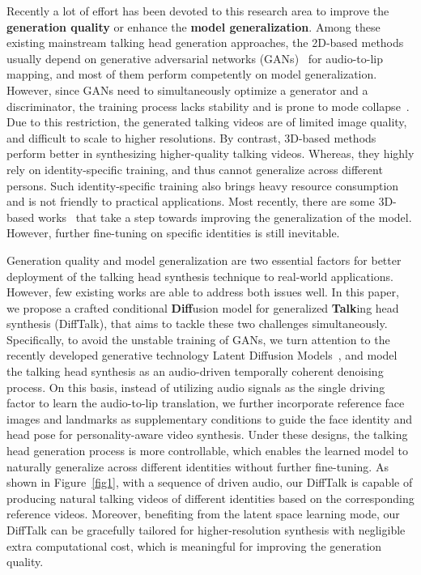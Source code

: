 \documentclass[10pt,twocolumn,letterpaper]{article}
\begin{document}
Recently a lot of effort has been devoted to this research area to improve the \textbf{generation quality} or enhance the \textbf{model generalization}.
Among these existing mainstream talking head generation approaches, the 2D-based methods usually depend on generative adversarial networks (GANs)~\cite{das2020speech,gu2020flnet,christos2020headgan,prajwal2020lip,kr2019towards} for audio-to-lip mapping, and most of them perform competently on model generalization. However, since GANs need to simultaneously optimize a generator and a discriminator, the training process lacks stability and is prone to mode collapse~\cite{dhariwal2021diffusion}. Due to this restriction, the generated talking videos are of limited image quality, and difficult to scale to higher resolutions.
By contrast, 3D-based methods~\cite{zollhofer2018state,blanz1999morphable,thies2016face2face,guo2021ad,yao2022dfa} perform better in synthesizing higher-quality talking videos. Whereas, they highly rely on identity-specific training, and thus cannot generalize across different persons. Such identity-specific training also brings heavy resource consumption and is not friendly to practical applications. Most recently, there are some 3D-based works~\cite{shen2022dfrf} that take a step towards improving the generalization of the model. However, further fine-tuning on specific identities is still inevitable.

Generation quality and model generalization are two essential factors for better deployment of the talking head synthesis technique to real-world applications. However, few existing works are able to address both issues well. In this paper, we propose a crafted conditional \textbf{Diff}usion model for generalized \textbf{Talk}ing head synthesis (DiffTalk), that aims to tackle these two challenges simultaneously. Specifically, to avoid the unstable training of GANs, we turn attention to the recently developed generative technology Latent Diffusion Models~\cite{rombach2022high}, and model the talking head synthesis as an audio-driven temporally coherent denoising process. On this basis, instead of utilizing audio signals as the single driving factor to learn the audio-to-lip translation, we further incorporate reference face images and landmarks as supplementary conditions to guide the face identity and head pose for personality-aware video synthesis. Under these designs, the talking head generation process is more controllable, which enables the learned model to naturally generalize across different identities without further fine-tuning. As shown in Figure~\ref{fig1}, with a sequence of driven audio, our DiffTalk is capable of producing natural talking videos of different identities based on the corresponding reference videos. Moreover, benefiting from the latent space learning mode, our DiffTalk can be gracefully tailored for higher-resolution synthesis with negligible extra computational cost, which is meaningful for improving the generation quality. 
\end{document}
